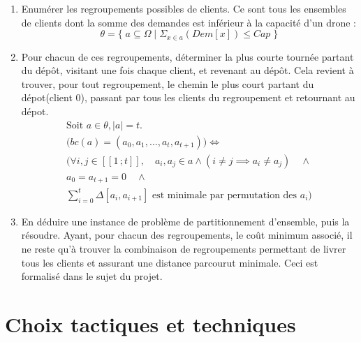 \documentclass[a4paper,10pt]{article}
\newcommand{\segm}[1]{[\![1\,;#1]\!]}
\begin{document}
\begin{enumerate}

\item Enumérer les regroupements possibles de clients. Ce sont tous les ensembles de clients dont la somme des demandes est inférieur à la capacité d'un drone :
\begin{equation*}
  \theta = \{\; a \subseteq \Omega \mid \Sigma_{x \in a}^{} (Dem[x]) \le Cap \; \}
\end{equation*}

\item Pour chacun de ces regroupements, déterminer la plus courte tournée partant du dépôt, visitant une fois chaque client, et revenant au dépôt. Cela revient à trouver, pour tout regroupement, le chemin le plus court partant du dépot(client $0$), passant par tous les clients du regroupement et retournant au dépot.
\begin{equation*}
  \begin{array}{l}
    \text{Soit } a \in \theta, |a| = t.\\
    \big(bc(a) = (a_0, a_1, \ldots, a_t, a_{t+1}) \big) \iff\\
    \big(\forall i,j \in \segm{t},\quad a_i,a_j \in a \land (i \neq j \implies a_i \neq a_j) \quad\land\\ 
    a_0 = a_{t+1} = 0 \quad\land\\
    \sum_{i=0}^{t} \Delta[a_i,a_{i+1}] \text{ est minimale par permutation des $a_i$}\big)
    \end{array}
\end{equation*}

\item En déduire une instance de problème de partitionnement d’ensemble, puis la résoudre. Ayant, pour chacun des regroupements, le coût minimum associé, il ne reste qu'à trouver la combinaison de regroupements permettant de livrer tous les clients et assurant une distance parcourut minimale. Ceci est formalisé dans le sujet du projet.

\end{enumerate}

\section{Choix tactiques et techniques}
\end{document}
